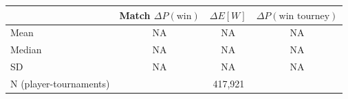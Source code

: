 \begin{tabular}{lccc}
\toprule
 & Match $\Delta P(\text{win})$ & $\Delta E[W]$ & $\Delta P(\text{win tourney})$ \\
\midrule
Mean & NA & NA & NA \\
Median & NA & NA & NA \\
SD & NA & NA & NA \\
N (player-tournaments) & \multicolumn{3}{c}{417,921} \\
\bottomrule
\end{tabular}
